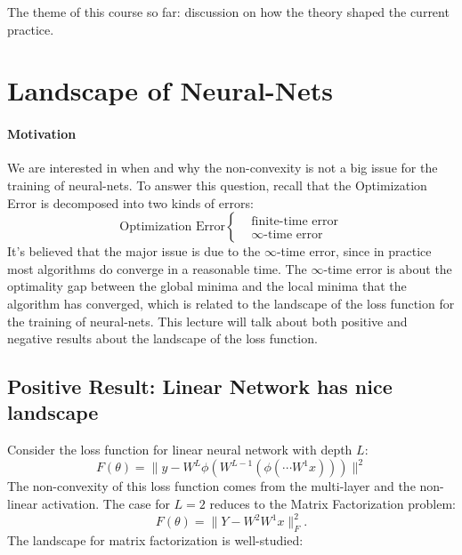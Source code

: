 The theme of this course so far: discussion on how the theory shaped the current practice.

\section{Landscape of Neural-Nets}
\paragraph{Motivation}
We are interested in when and why the non-convexity is not a big issue for the training of neural-nets. To answer this question, recall that the Optimization Error is decomposed into two kinds of errors:
\[
\mbox{Optimization Error}\left\{
\begin{aligned}
&\mbox{finite-time error}\\
&\mbox{$\infty$-time error}
\end{aligned}
\right.
\]
It's believed that the major issue is due to the $\infty$-time error, since in practice most algorithms do converge in a reasonable time.
The $\infty$-time error is about the optimality gap between the global minima and the local minima that the algorithm has converged, which is related to the landscape of the loss function for the training of neural-nets.
This lecture will talk about both positive and negative results about the landscape of the loss function.
%
%

\subsection{Positive Result: Linear Network has nice landscape}
Consider the loss function for linear neural network with depth $L$:
\[
F(\theta) = \|y - W^L\phi(W^{L-1}(\phi(\cdots W^1x)))\|^2
\]
The non-convexity of this loss function comes from the multi-layer and the non-linear activation.
The case for $L=2$ reduces to the Matrix Factorization problem:
\[
F(\theta) = \|Y - W^2W^1x\|_F^2.
\]
The landscape for matrix factorization is well-studied:

